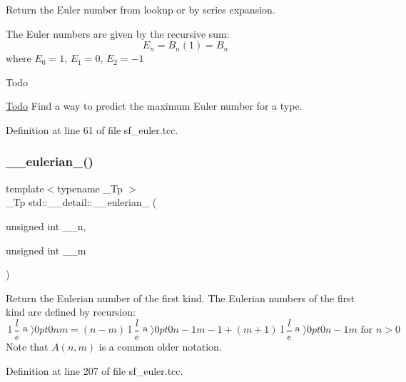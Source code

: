 Return the Euler number from lookup or by series expansion.

The Euler numbers are given by the recursive sum\+: \[ E_n = B_n(1) = B_n \] where $ E_0 = 1 $, $ E_1 = 0 $, $ E_2 = -1 $

\begin{DoxyRefDesc}{Todo}
\item[\hyperlink{todo__todo000008}{Todo}]Find a way to predict the maximum Euler number for a type. \end{DoxyRefDesc}


Definition at line 61 of file sf\+\_\+euler.\+tcc.

\mbox{\label{namespacestd_1_1____detail_a4556229d8792527574bfc6fa135908dd}} 
\subsubsection{\texorpdfstring{\+\_\+\+\_\+eulerian\+\_()}{\_\_eulerian\_1()}}
{\footnotesize\ttfamily template$<$typename \+\_\+\+Tp $>$ \\
\+\_\+\+Tp std\+::\+\_\+\+\_\+detail\+::\+\_\+\+\_\+eulerian\+\_ (\begin{DoxyParamCaption}\item[{unsigned int}]{\+\_\+\+\_\+n,  }\item[{unsigned int}]{\+\_\+\+\_\+m }\end{DoxyParamCaption})\hspace{0.3cm}{\ttfamily [inline]}}

Return the Eulerian number of the first kind. The Eulerian numbers of the first kind are defined by recursion\+: \[ \genfrac\langle\rangle{0pt}{0}{n}{m} = (n-m)\genfrac\langle\rangle{0pt}{0}{n-1}{m-1} + (m+1)\genfrac\langle\rangle{0pt}{0}{n-1}{m} \mbox{ for } n > 0 \] Note that $ A(n,m) $ is a common older notation. 

Definition at line 207 of file sf\+\_\+euler.\+tcc.

\mbox{\label{namespacestd_1_1____detail_afab99319465d188432fa8357d65129e0}} 
